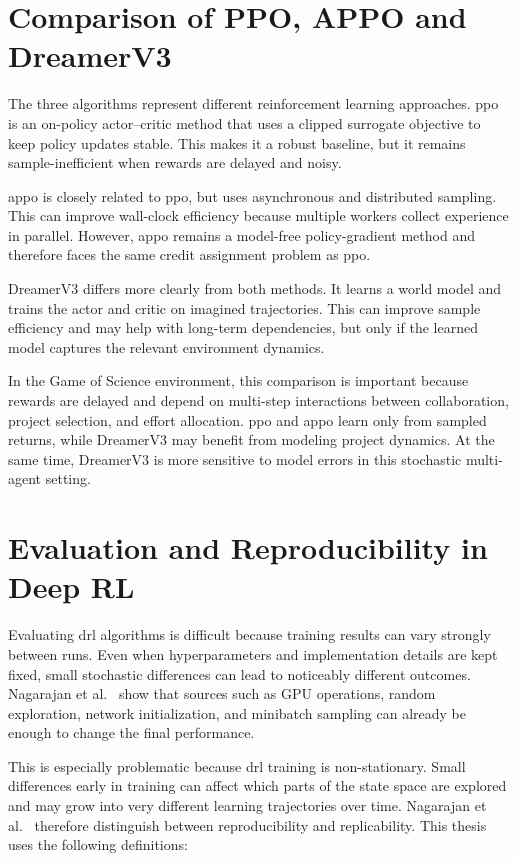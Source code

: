 \documentclass[english,bachelor]{hsluthesis}
\begin{document}
\section{Comparison of PPO, APPO and DreamerV3}

The three algorithms represent different reinforcement learning approaches. \gls{ppo} is an on-policy actor--critic method that uses a clipped surrogate objective to keep policy updates stable. This makes it a robust baseline, but it remains sample-inefficient when rewards are delayed and noisy.

\gls{appo} is closely related to \gls{ppo}, but uses asynchronous and distributed sampling. This can improve wall-clock efficiency because multiple workers collect experience in parallel. However, \gls{appo} remains a model-free policy-gradient method and therefore faces the same credit assignment problem as \gls{ppo}.

DreamerV3 differs more clearly from both methods. It learns a world model and trains the actor and critic on imagined trajectories. This can improve sample efficiency and may help with long-term dependencies, but only if the learned model captures the relevant environment dynamics.

In the Game of Science environment, this comparison is important because rewards are delayed and depend on multi-step interactions between collaboration, project selection, and effort allocation. \gls{ppo} and \gls{appo} learn only from sampled returns, while DreamerV3 may benefit from modeling project dynamics. At the same time, DreamerV3 is more sensitive to model errors in this stochastic multi-agent setting.

\section{Evaluation and Reproducibility in Deep RL}

Evaluating \gls{drl} algorithms is difficult because training results can vary strongly between runs. Even when hyperparameters and implementation details are kept fixed, small stochastic differences can lead to noticeably different outcomes. Nagarajan et al.~\cite{Nagarajan2018TheIO} show that sources such as GPU operations, random exploration, network initialization, and minibatch sampling can already be enough to change the final performance.

This is especially problematic because \gls{drl} training is non-stationary. Small differences early in training can affect which parts of the state space are explored and may grow into very different learning trajectories over time. Nagarajan et al.~\cite{Nagarajan2018TheIO} therefore distinguish between reproducibility and replicability. This thesis uses the following definitions:
\end{document}
